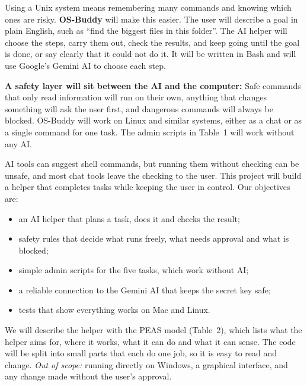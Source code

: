 \documentclass[11pt,a4paper]{article}
\newcommand{\sect}[1]{\par\vspace{0.5em}{\large\bfseries #1}\par\vspace{0.1em}}
\begin{document}
\sect{Description}
Using a Unix system means remembering many commands and knowing which ones are risky. \textbf{OS-Buddy} will make this easier. The user will describe a goal in plain English, such as “find the biggest files in this folder”. The AI helper will choose the steps, carry them out, check the results, and keep going until the goal is done, or say clearly that it could not do it. It will be written in Bash and will use Google’s Gemini AI to choose each step.

\textbf{A safety layer will sit between the AI and the computer:} Safe commands that only read information will run on their own, anything that changes something will ask the user first, and dangerous commands will always be blocked. OS-Buddy will work on Linux and similar systems, either as a chat or as a single command for one task. The admin scripts in Table~1 will work without any AI.
\newpage

\sect{Problem and Objectives}
AI tools can suggest shell commands, but running them without checking can be unsafe, and most chat tools leave the checking to the user. This project will build a helper that completes tasks while keeping the user in control. Our objectives are:
\begin{itemize}[itemsep=0pt,topsep=2pt,parsep=0pt,leftmargin=2em]
  \item an AI helper that plans a task, does it and checks the result;
  \item safety rules that decide what runs freely, what needs approval and what is blocked;
  \item simple admin scripts for the five tasks, which work without AI;
  \item a reliable connection to the Gemini AI that keeps the secret key safe;
  \item tests that show everything works on Mac and Linux.
\end{itemize}

\sect{Design Approach and Scope}
We will describe the helper with the PEAS model (Table~2), which lists what the helper aims for, where it works, what it can do and what it can sense. The code will be split into small parts that each do one job, so it is easy to read and change. \emph{Out of scope:} running directly on Windows, a graphical interface, and any change made without the user’s approval.
\end{document}
